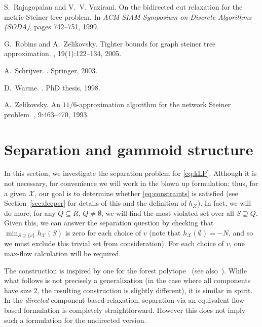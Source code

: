 \documentclass[11pt, letterpaper]{article}
\theoremstyle{definition}
\newcommand{\grphx}{\mathcal{X}}
\newcommand{\slkx}{h_{\grphx}}
\begin{document}
\begin{thebibliography}{10}
S.~Rajagopalan and V.~V. Vazirani.
\newblock On the bidirected cut relaxation for the metric {S}teiner tree
  problem.
\newblock In {\em {ACM}-{SIAM} Symposium on Discrete Algorithms (SODA)}, pages
  742--751, 1999.

G.~Robins and A.~Zelikovsky.
\newblock Tighter bounds for graph steiner tree approximation.
, 19(1):122--134, 2005.

A.~Schrijver.
.
\newblock Springer, 2003.

D.~Warme.
.
\newblock PhD thesis, 1998.

A.~Zelikovsky.
\newblock An $11/6$-approximation algorithm for the network {Steiner} problem.
, 9:463--470, 1993.

\end{thebibliography}



\newpage
\appendix
\section{Separation and gammoid structure}\label{appendix:sep}
In this section, we investigate the separation problem for \eqref{eq:kLP}. 
Although it is not necessary, for convenience we will work in the blown up formulation; thus, for a given $\grphx$, our goal is to determine whether \eqref{eq:constraints} is satisfied (see Section~\ref{sec:deeper} for details of this and the definition of $\slkx$). 
In fact, we will do more; for any $Q \subseteq R$, $Q \neq \emptyset$, we will find the most violated set over all $S \supseteq Q$. Given this, we can answer the separation question by checking that \(\min_{S \supseteq \{ v \} } \slkx(S)\) is zero for each choice of $v$ (note that $\slkx(\emptyset) = -N$, and so we must exclude this trivial set from consideration). For each choice of $v$, one max-flow calculation will be required.


The construction is inspired by one for the forest polytope~\cite{picard1982,padberg1983} (see also~\cite[\S51.4]{schrijver_2003_combinatorial}). While what follows is not precisely a generalization (in the case where all components have size $2$, the resulting construction is slightly different), it is similar in spirit.
In the \emph{directed} component-based relaxation, separation via an equivalent flow-based formulation is completely straightforward.
However this does not imply such a formulation for the undirected version.
\end{document}
